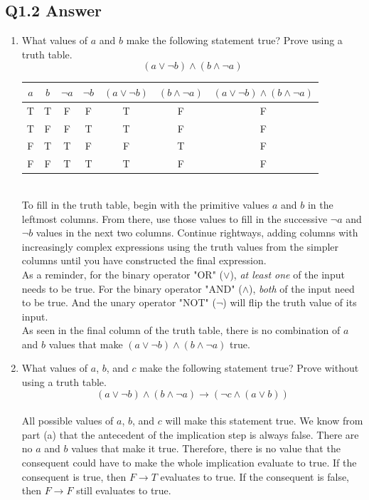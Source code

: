 \documentclass{article}
\begin{document}
\subsection*{Q1.2 Answer}
\begin{enumerate}[label=\alph*.]
    \item What values of $a$ and $b$ make the following statement true? Prove using a truth table.
    $$(a \lor \neg b) \land (b \land \neg a)$$
    \begin{tabular}{|c|c|c|c|c|c|c|}
     \hline
     $a$ & $b$ & $\neg a$ & $\neg b$ & $(a\lor \neg b)$ & $(b\land\neg a)$ & $(a\lor \neg b)\land(b\land\neg a)$ \\ 
     \hline
     T & T & F & F & T & F & F \\  
     T & F & F & T & T & F & F \\
     F & T & T & F & F & T & F \\  
     F & F & T & T & T & F & F \\
     \hline
    \end{tabular}
    \\ To fill in the truth table, begin with the primitive values $a$ and $b$ in the leftmost columns. From there, use those values to fill in the successive $\neg a$ and $\neg b$ values in the next two columns. Continue rightways, adding columns with increasingly complex expressions using the truth values from the simpler columns until you have constructed the final expression.
    \\ As a reminder, for the binary operator "OR" ($\lor$), \textit{at least one} of the input needs to be true. For the binary operator "AND" ($\land$), \textit{both} of the input need to be true. And the unary operator "NOT" ($\neg$) will flip the truth value of its input.
    \\ As seen in the final column of the truth table, there is no combination of $a$ and $b$ values that make $(a\lor \neg b)\land(b\land\neg a)$ true.
    \item What values of $a$, $b$, and $c$ make the following statement true? Prove without using a truth table.
    $$(a \lor \neg b) \land (b \land \neg a)\rightarrow (\neg c\land(a\lor b))$$
    \\ All possible values of $a$, $b$, and $c$ will make this statement true. We know from part (a) that the antecedent of the implication step is always false. There are no $a$ and $b$ values that make it true. Therefore, there is no value that the consequent could have to make the whole implication evaluate to true. If the consequent is true, then $F\rightarrow T$ evaluates to true. If the consequent is false, then $F\rightarrow F$ still evaluates to true. 
\end{enumerate}
\newpage
\end{document}
